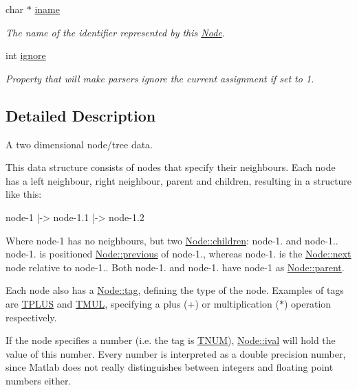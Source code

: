 \begin{DoxyCompactItemize}
char $\ast$ \hyperlink{structNode_a76c70ae7ac3d58ebe41da968fedb8093}{iname}
\begin{DoxyCompactList}\small\item\em The name of the identifier represented by this \hyperlink{structNode}{Node}. \end{DoxyCompactList}\item 
int \hyperlink{structNode_a28a2a20ee60bdfbd168e4f4bf20d8c82}{ignore}
\begin{DoxyCompactList}\small\item\em Property that will make parsers ignore the current assignment if set to 1. \end{DoxyCompactList}\end{DoxyCompactItemize}


\subsection{Detailed Description}
A two dimensional node/tree data. 

This data structure consists of nodes that specify their neighbours. Each node has a left neighbour, right neighbour, parent and children, resulting in a structure like this\-: \begin{DoxyVerb}node-1
  |-> node-1.1
  |-> node-1.2 
\end{DoxyVerb}
 Where node-\/1 has no neighbours, but two \hyperlink{structNode_a827ac726d02ddf6d00ba8a55cd296df2}{Node\-::children}\-: node-\/1. and node-\/1.. node-\/1. is positioned \hyperlink{structNode_a9a9311efc5dc64017bf492a386b77b0d}{Node\-::previous} of node-\/1., whereas node-\/1. is the \hyperlink{structNode_aa162dd1e0693188a22b1f13b9a2a0ef0}{Node\-::next} node relative to node-\/1.. Both node-\/1. and node-\/1. have node-\/1 as \hyperlink{structNode_a7b739036012f282683e6452a0b1595af}{Node\-::parent}.

Each node also has a \hyperlink{structNode_aae55c9a8e76121d7f9c721c0239e6fb8}{Node\-::tag}, defining the type of the node. Examples of tags are \hyperlink{node_8h_a83ba1e84fa23f6619c3d29036b160919ab61d4391af9740a542e317b9ce6a3d2e}{T\-P\-L\-U\-S} and \hyperlink{node_8h_a83ba1e84fa23f6619c3d29036b160919a2f6da8014bbb780265737f3edb98f928}{T\-M\-U\-L}, specifying a plus (+) or multiplication ($\ast$) operation respectively.

If the node specifies a number (i.\-e. the tag is \hyperlink{node_8h_a83ba1e84fa23f6619c3d29036b160919a71fff872f388505135681e9fad482e72}{T\-N\-U\-M}), \hyperlink{structNode_ad7f9455e819b623c0e4a9480476eacfe}{Node\-::ival} will hold the value of this number. Every number is interpreted as a double precision number, since Matlab does not really distinguishes between integers and floating point numbers either.

